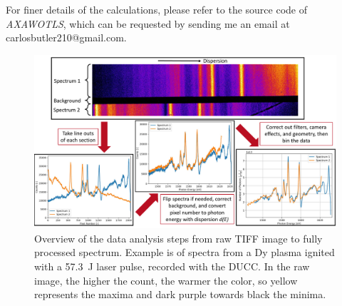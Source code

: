 For finer details of the calculations, please refer to the source code of \textit{AXAWOTLS}, which can be requested by sending me an email at carlosbutler210@gmail.com.

\begin{figure}[H]
	\centering
	\includegraphics[width=\textwidth]{Data_Analysis/Analysis_overview.pdf}
	\caption{Overview of the data analysis steps from raw TIFF image to fully 
	processed spectrum. Example is of spectra from a Dy plasma ignited with a 
	\SI{57.3}{\joule} laser pulse, recorded with the DUCC. In the raw image, 
	the higher the count, the warmer the color, so yellow represents the maxima 
	and dark purple towards black the minima.}
	\label{fig: analysis overview}
\end{figure}


